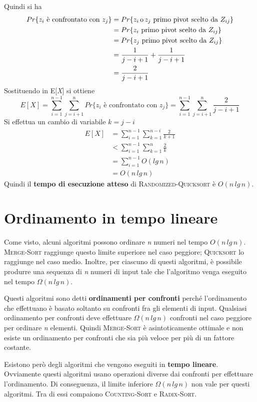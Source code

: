 \documentclass[10pt, a4paper]{report}
\begin{document}
Quindi si ha
\begin{align*}
Pr\{z_i \text{ è confrontato con } z_j\} &= Pr\{z_i \text{\,o\,} z_j \text{ primo pivot scelto da } Z_{ij}\} \\
&= Pr\{z_i \text{ primo pivot scelto da } Z_{ij}\} \\
&= Pr\{z_j \text{ primo pivot scelto da } Z_{ij}\} \\
&= \frac{1}{j-i+1} + \frac{1}{j-i+1} \\
&= \frac{2}{j-i+1}
\end{align*}
Sostituendo in E[\textit{X}] si ottiene
\begin{equation*}
E[X] = \sum_{i=1}^{n-1}\sum_{j=i+1}^{n} Pr\{z_i \text{ è confrontato con } z_j\} = \sum_{i=1}^{n-1}\sum_{j=i+1}^{n}\frac{2}{j-i+1}
\end{equation*}
Si effettua un cambio di variabile $ k = j - i$
\begin{align*}
E[X] &= \sum_{i=1}^{n-1}\sum_{k=1}^{n-i}\frac{2}{k+1} \\
&< \sum_{i=1}^{n-1}\sum_{k=1}^{n}\frac{2}{k} \\
&=  \sum_{i=1}^{n-1}O(lg\,n) \\
&= O(n\,lg\,n)
\end{align*}
Quindi il \textbf{tempo di esecuzione atteso} di \textsc{Randomized-Quicksort} è $O(n\,lg\,n)$.
\chapter{Ordinamento in tempo lineare}
Come visto, alcuni algoritmi possono ordinare \textit{n} numeri nel tempo $O(n\,lg\,n)$. \textsc{Merge-Sort} raggiunge questo limite superiore nel caso peggiore; \textsc{Quicksort} lo raggiunge nel caso medio. Inoltre, per ciascuno di questi algoritmi, è possibile produrre una sequenza di \textit{n} numeri di input tale che l'algoritmo venga eseguito nel tempo $\Omega(n\,lg\,n)$.

Questi algoritmi sono detti \textbf{ordinamenti per confronti} perché l'ordinamento che effettuano è basato soltanto su confronti fra gli elementi di input. Qualsiasi ordinamento per confronti deve effettuare $\Omega(n\,lg\,n)$ confronti nel caso peggiore per ordinare \textit{n} elementi. Quindi \textsc{Merge-Sort} è asintoticamente ottimale e non esiste un ordinamento per confronti che sia più veloce per più di un fattore costante.

Esistono però degli algoritmi che vengono eseguiti in \textbf{tempo lineare}. Ovviamente questi algoritmi usano operazioni diverse dai confronti per effettuare l'ordinamento. Di conseguenza, il limite inferiore $\Omega(n\,lg\,n)$ non vale per questi algoritmi. Tra di essi compaiono \textsc{Counting-Sort} e \textsc{Radix-Sort}.
\end{document}
